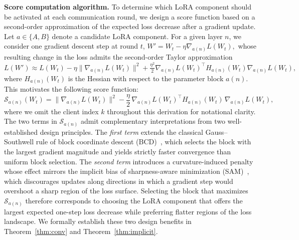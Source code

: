 \textbf{Score computation algorithm.} To determine which LoRA component should be activated at each communication round, we design a score function based on a second-order approximation of the expected loss decrease after a gradient update. Let $a \in \{A, B\}$ denote a candidate LoRA component. For a given layer $n$, we consider one gradient descent step at round $t$,
$
W' = W_t - \eta \nabla_{a(n)} L(W_t),
$
whose resulting change in the loss admits the second-order Taylor approximation
$
L(W') \approx L(W_t) 
- \eta \|\nabla_{a(n)} L(W_t)\|^2 
+ \frac{\eta^2}{2} \nabla_{a(n)} L(W_t)^\top H_{a(n)}(W_t) \nabla_{a(n)} L(W_t),
$
where $H_{a(n)}(W_t)$ is the Hessian with respect to the parameter block $a(n)$. This motivates the following score function:
\begin{equation}
\label{eq:score_function} 
\mathcal{S}_{a(n)}(W_t) =
\|\nabla_{a(n)} L(W_t)\|^2 
- \frac{\eta}{2}\, \nabla_{a(n)} L(W_t)^\top H_{a(n)}(W_t)\, \nabla_{a(n)} L(W_t),
\end{equation}
where we omit the client index $k$ throughout this derivation for notational clarity. The two terms in $\mathcal{S}_{a(n)}$ admit complementary interpretations from two well-established design principles. The \emph{first term} extends the classical Gauss--Southwell rule of block coordinate descent (BCD)~\cite{nesterov2012bcd}, which selects the block with the largest gradient magnitude and yields strictly faster convergence than uniform block selection. The \emph{second term} introduces a curvature-induced penalty whose effect mirrors the implicit bias of sharpness-aware minimization (SAM)~\cite{foret2021sam}, which discourages updates along directions in which a gradient step would overshoot a sharp region of the loss surface. Selecting the block that maximizes $\mathcal{S}_{a(n)}$ therefore corresponds to choosing the LoRA component that offers the largest expected one-step loss decrease while preferring flatter regions of the loss landscape. We formally establish these two design benefits in Theorem~\ref{thm:conv} and Theorem~\ref{thm:implicit}. 



